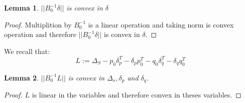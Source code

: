 \documentclass[11pt,twocolumn,varwidth=true,a4paper,fleqn]{article}
\newtheorem{lemma}{Lemma}
\begin{document}
\begin{lemma} \label{delta}
$||B_0^{-1}\delta||$ is convex in $\delta$
\end{lemma}
\begin{proof}
Multiplition by $B_0^{-1}$ is a linear operation and taking norm is convex
operation and therefore $||B_0^{-1}\delta||$ is convex in $\delta$.
\end{proof}

We recall that:
\begin{equation*} 
L:= \Delta_S - p_0\delta_p^T - \delta_pp_0^T - q_0\delta_q^T - \delta_qq_0^T
\end{equation*}
\begin{lemma} \label{L}
$||B_0^{-1}L||$ is convex in $\Delta_s, \delta_p$
and $\delta_q$.
\end{lemma}
\begin{proof}
$L$ is linear in the variables and therefore convex in theses variables.
\end{proof}
\end{document}
